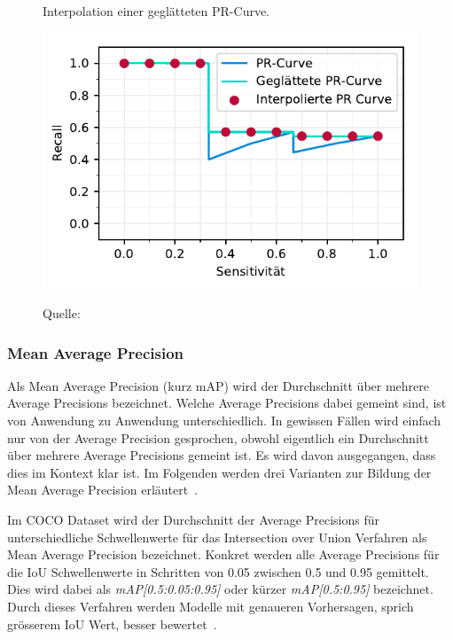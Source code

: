 \begin{figure}[h!]
    \captionsetup{width=.9\linewidth}
    \caption{Interpolation einer geglätteten PR-Curve.}
    \label{fig:pr-interpolated}
    \centering
    \includegraphics[scale=1]{graphics/matplot/ap__pr-interpolated.pdf}\\
    \caption*{Quelle: \textcite{AP}}
\end{figure}

\subsubsection{Mean Average Precision}
\label{chap:map}

Als Mean Average Precision (kurz mAP) wird der Durchschnitt über mehrere Average Precisions bezeichnet. Welche Average Precisions dabei gemeint sind, ist von Anwendung zu Anwendung unterschiedlich. In gewissen Fällen wird einfach nur von der Average Precision gesprochen, obwohl eigentlich ein Durchschnitt über mehrere Average Precisions gemeint ist. Es wird davon ausgegangen, dass dies im Kontext klar ist. Im Folgenden werden drei Varianten zur Bildung der Mean Average Precision erläutert~\autocite{AP}.

Im COCO Dataset wird der Durchschnitt der Average Precisions für unterschiedliche Schwellenwerte für das Intersection over Union Verfahren als Mean Average Precision bezeichnet. Konkret werden alle Average Precisions für die IoU Schwellenwerte in Schritten von 0.05 zwischen 0.5 und 0.95 gemittelt. Dies wird dabei als \textit{mAP[0.5:0.05:0.95]} oder kürzer \textit{mAP[0.5:0.95]} bezeichnet. Durch dieses Verfahren werden Modelle mit genaueren Vorhersagen, sprich grösserem IoU Wert, besser bewertet~\autocite{AP}.

